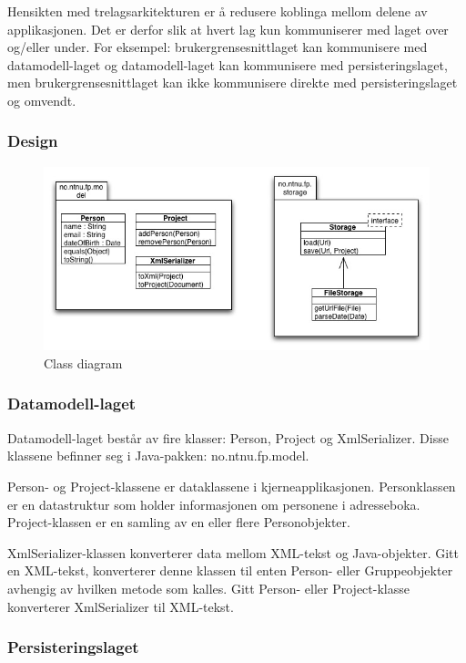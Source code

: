 \documentclass[a4paper]{scrartcl}
\begin{document}
Hensikten med trelagsarkitekturen er å redusere koblinga mellom delene av applikasjonen. Det er derfor slik at hvert lag kun kommuniserer med laget over og/eller under. For eksempel: brukergrensesnittlaget kan kommunisere med datamodell-laget og datamodell-laget kan kommunisere med persisteringslaget, men brukergrensesnittlaget kan ikke kommunisere direkte med persisteringslaget og omvendt.

\subsubsection{Design}

\begin{figure}[H]
    \centering
    \includegraphics[width=\textwidth]{resources/design-classdiagram.jpg}
    \caption{Class diagram}
    \label{fig:classdiagram}
\end{figure}

\subsubsection{Datamodell-laget}

Datamodell-laget består av fire klasser: Person, Project og XmlSerializer.  Disse klassene befinner seg i Java-pakken: no.ntnu.fp.model.

Person- og Project-klassene er dataklassene i kjerneapplikasjonen. Personklassen er en datastruktur som holder informasjonen om personene i adresseboka. Project-klassen er en samling av en eller flere Personobjekter.

XmlSerializer-klassen konverterer data mellom XML-tekst og Java-objekter. Gitt en XML-tekst, konverterer denne klassen til enten Person- eller Gruppeobjekter avhengig av hvilken metode som kalles. Gitt Person- eller Project-klasse konverterer XmlSerializer til XML-tekst. 

\subsubsection{Persisteringslaget}
\end{document}
